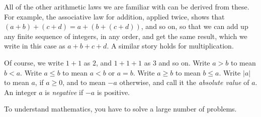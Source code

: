 \smallskip\noindent{}All of the other arithmetic laws we are familiar with can be derived from these.
For example, the associative law for addition, applied twice, shows that \((a+b)+(c+d)=a+(b+(c+d))\), and so on, so that we can add up any finite sequence of integers, in any order, and get the same result, which we write in this case as \(a+b+c+d\).
A similar story holds for multiplication.

Of course, we write \(1+1\) as \(2\), and \(1+1+1\) as \(3\) and so on.
Write \(a>b\) to mean \(b<a\).
Write \(a\le b\) to mean \(a<b\) or \(a=b\). 
Write \(a\ge b\) to mean \(b \le a\).
Write \(|a|\) to mean \(a\), if \(a \ge 0\), and to mean \(-a\) otherwise, and call it the \emph{absolute value} of \(a\).
An integer \(a\) is \emph{negative} if \(-a\) is positive.

\newpage

To understand mathematics, you have to solve a large number of problems.

\bigskip

